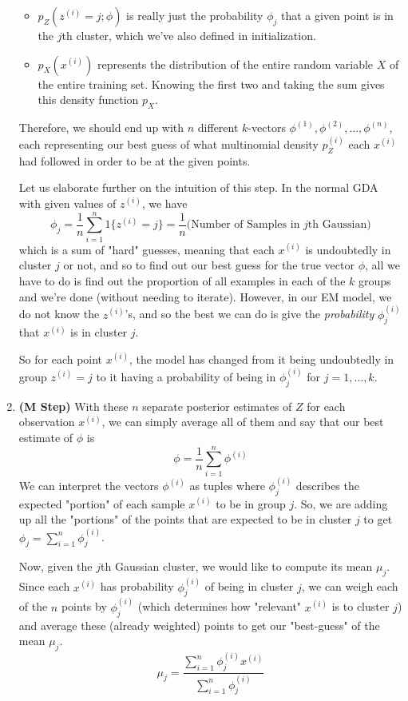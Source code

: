 \documentclass{article}
\begin{document}
\begin{definition}[EM Algorithm]
\begin{enumerate}
\begin{itemize}
              \item $p_Z(z^{(i)} = j; \phi)$ is really just the probability $\phi_j$ that a given point is in the $j$th cluster, which we've also defined in initialization.
              \item $p_X(x^{(i)})$ represents the distribution of the entire random variable $X$ of the entire training set. Knowing the first two and taking the sum gives this density function $p_X$.
          \end{itemize}
          Therefore, we should end up with $n$ different $k$-vectors $\phi^{(1)}, \phi^{(2)}, \ldots, \phi^{(n)}$, each representing our best guess of what multinomial density $p_Z^{(i)}$ each $x^{(i)}$ had followed in order to be at the given points.

          Let us elaborate further on the intuition of this step. In the normal GDA with given values of $z^{(i)}$, we have
          \[\phi_j = \frac{1}{n} \sum_{i=1}^n 1\{z^{(i)} = j\} = \frac{1}{n}\big(\text{Number of Samples in }j\text{th Gaussian}\big)\]
          which is a sum of "hard" guesses, meaning that each $x^{(i)}$ is undoubtedly in cluster $j$ or not, and so to find out our best guess for the true vector $\phi$, all we have to do is find out the proportion of all examples in each of the $k$ groups and we're done (without needing to iterate). However, in our EM model, we do not know the $z^{(i)}$'s, and so the best we can do is give the \textit{probability} $\phi^{(i)}_j$ that $x^{(i)}$ is in cluster $j$.

          So for each point $x^{(i)}$, the model has changed from it being undoubtedly in group $z^{(i)} = j$ to it having a probability of being in $\phi^{(i)}_j$ for $j = 1, \ldots, k$.

          \item \textbf{(M Step)} With these $n$ separate posterior estimates of $Z$ for each observation $x^{(i)}$, we can simply average all of them and say that our best estimate of $\phi$ is
          \[\phi = \frac{1}{n} \sum_{i=1}^n \phi^{(i)}\]
          We can interpret the vectors $\phi^{(i)}$ as tuples where $\phi^{(i)}_j$ describes the expected "portion" of each sample $x^{(i)}$ to be in group $j$. So, we are adding up all the "portions" of the points that are expected to be in cluster $j$ to get $\phi_j = \sum_{i=1}^n \phi_j^{(i)}$.

          Now, given the $j$th Gaussian cluster, we would like to compute its mean $\mu_j$. Since each $x^{(i)}$ has probability $\phi^{(i)}_j$ of being in cluster $j$, we can weigh each of the $n$ points by $\phi^{(i)}_j$ (which determines how "relevant" $x^{(i)}$ is to cluster $j$) and average these (already weighted) points to get our "best-guess" of the mean $\mu_j$.
          \[\mu_j = \frac{\sum_{i=1}^n \phi^{(i)}_j x^{(i)}}{\sum_{i=1}^n \phi_j^{(i)}}\]


\end{enumerate}
\end{definition}
\end{document}
